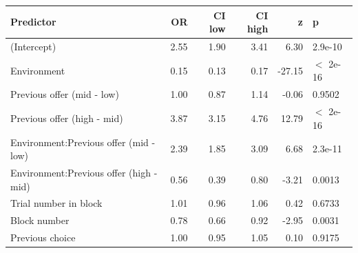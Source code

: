 \begin{table}[ht]
\centering
\begin{tabular}{lrrrrl}
  \hline
Predictor & OR & CI low & CI high & z & p \\ 
  \hline
(Intercept) & 2.55 & 1.90 & 3.41 & 6.30 & 2.9e-10 \\ 
  Environment & 0.15 & 0.13 & 0.17 & -27.15 & $<$ 2e-16 \\ 
  Previous offer (mid - low) & 1.00 & 0.87 & 1.14 & -0.06 & 0.9502 \\ 
  Previous offer (high - mid) & 3.87 & 3.15 & 4.76 & 12.79 & $<$ 2e-16 \\ 
  Environment:Previous offer (mid - low) & 2.39 & 1.85 & 3.09 & 6.68 & 2.3e-11 \\ 
  Environment:Previous offer (high - mid) & 0.56 & 0.39 & 0.80 & -3.21 & 0.0013 \\ 
  Trial number in block & 1.01 & 0.96 & 1.06 & 0.42 & 0.6733 \\ 
  Block number & 0.78 & 0.66 & 0.92 & -2.95 & 0.0031 \\ 
  Previous choice & 1.00 & 0.95 & 1.05 & 0.10 & 0.9175 \\ 
   \hline
\end{tabular}
\end{table}

